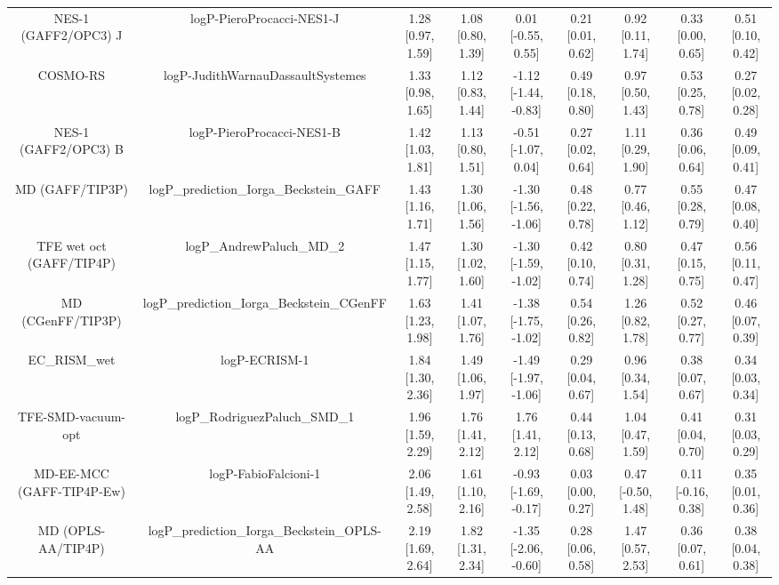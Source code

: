 \documentclass{article}
\begin{document}
\begin{center}
\begin{longtable}{|ccccccccc|}
         NES-1 (GAFF2/OPC3) J &                      logP-PieroProcacci-NES1-J &  1.28 [0.97, 1.59] &  1.08 [0.80, 1.39] &    0.01 [-0.55, 0.55] &  0.21 [0.01, 0.62] &     0.92 [0.11, 1.74] &     0.33 [0.00, 0.65] &     0.51 [0.10, 0.42] \\
                     COSMO-RS &              logP-JudithWarnauDassaultSystemes &  1.33 [0.98, 1.65] &  1.12 [0.83, 1.44] &  -1.12 [-1.44, -0.83] &  0.49 [0.18, 0.80] &     0.97 [0.50, 1.43] &     0.53 [0.25, 0.78] &     0.27 [0.02, 0.28] \\
         NES-1 (GAFF2/OPC3) B &                      logP-PieroProcacci-NES1-B &  1.42 [1.03, 1.81] &  1.13 [0.80, 1.51] &   -0.51 [-1.07, 0.04] &  0.27 [0.02, 0.64] &     1.11 [0.29, 1.90] &     0.36 [0.06, 0.64] &     0.49 [0.09, 0.41] \\
              MD (GAFF/TIP3P) &       logP\_prediction\_Iorga\_Beckstein\_GAFF &  1.43 [1.16, 1.71] &  1.30 [1.06, 1.56] &  -1.30 [-1.56, -1.06] &  0.48 [0.22, 0.78] &     0.77 [0.46, 1.12] &     0.55 [0.28, 0.79] &     0.47 [0.08, 0.40] \\
     TFE wet oct (GAFF/TIP4P) &                      logP\_AndrewPaluch\_MD\_2 &  1.47 [1.15, 1.77] &  1.30 [1.02, 1.60] &  -1.30 [-1.59, -1.02] &  0.42 [0.10, 0.74] &     0.80 [0.31, 1.28] &     0.47 [0.15, 0.75] &     0.56 [0.11, 0.47] \\
            MD (CGenFF/TIP3P) &     logP\_prediction\_Iorga\_Beckstein\_CGenFF &  1.63 [1.23, 1.98] &  1.41 [1.07, 1.76] &  -1.38 [-1.75, -1.02] &  0.54 [0.26, 0.82] &     1.26 [0.82, 1.78] &     0.52 [0.27, 0.77] &     0.46 [0.07, 0.39] \\
                  EC_RISM_wet &                                  logP-ECRISM-1 &  1.84 [1.30, 2.36] &  1.49 [1.06, 1.97] &  -1.49 [-1.97, -1.06] &  0.29 [0.04, 0.67] &     0.96 [0.34, 1.54] &     0.38 [0.07, 0.67] &     0.34 [0.03, 0.34] \\
           TFE-SMD-vacuum-opt &                  logP\_RodriguezPaluch\_SMD\_1 &  1.96 [1.59, 2.29] &  1.76 [1.41, 2.12] &     1.76 [1.41, 2.12] &  0.44 [0.13, 0.68] &     1.04 [0.47, 1.59] &     0.41 [0.04, 0.70] &     0.31 [0.03, 0.29] \\
    MD-EE-MCC (GAFF-TIP4P-Ew) &                           logP-FabioFalcioni-1 &  2.06 [1.49, 2.58] &  1.61 [1.10, 2.16] &  -0.93 [-1.69, -0.17] &  0.03 [0.00, 0.27] &    0.47 [-0.50, 1.48] &    0.11 [-0.16, 0.38] &     0.35 [0.01, 0.36] \\
           MD (OPLS-AA/TIP4P) &    logP\_prediction\_Iorga\_Beckstein\_OPLS-AA &  2.19 [1.69, 2.64] &  1.82 [1.31, 2.34] &  -1.35 [-2.06, -0.60] &  0.28 [0.06, 0.58] &     1.47 [0.57, 2.53] &     0.36 [0.07, 0.61] &     0.38 [0.04, 0.38] \\

\end{longtable}
\end{center}
\end{document}
